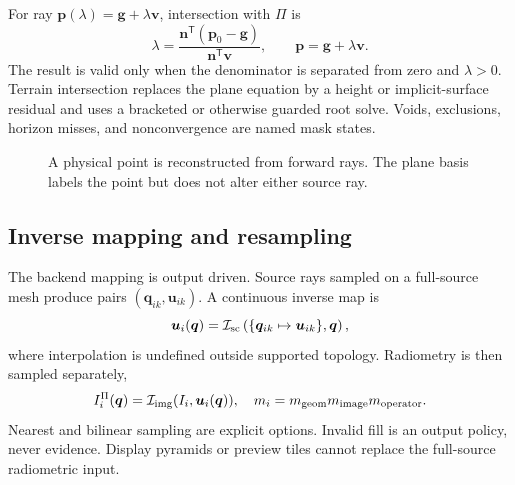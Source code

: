 \documentclass[journal]{IEEEtran}
\newcommand{\T}{^{\mathsf T}}
\begin{document}
For ray $\bm p(\lambda)=\bm g+\lambda\bm v$, intersection with $\Pi$ is
\begin{equation}
\lambda=\frac{\bm n\T(\bm p_0-\bm g)}{\bm n\T\bm v},\qquad
\bm p=\bm g+\lambda\bm v.
\label{eq:rayplane}
\end{equation}
The result is valid only when the denominator is separated from zero and
$\lambda>0$. Terrain intersection replaces the plane equation by a height or
implicit-surface residual and uses a bracketed or otherwise guarded root solve.
Voids, exclusions, horizon misses, and nonconvergence are named mask states.

\begin{figure}[t]
\centering
{}
\caption{A physical point is reconstructed from forward rays. The plane basis
labels the point but does not alter either source ray.}
\label{fig:rayplane}
\end{figure}

\subsection{Inverse mapping and resampling}

The backend mapping is output driven. Source rays sampled on a full-source mesh
produce pairs $(\bm q_{ik},\bm u_{ik})$. A continuous inverse map is
\begin{equation}
\bm u_i(\bm q)=\mathcal I_{\rm sc}
\left(\{\bm q_{ik}\mapsto\bm u_{ik}\},\bm q\right),
\label{eq:inversemap}
\end{equation}
where interpolation is undefined outside supported topology. Radiometry is then
sampled separately,
\begin{equation}
I_i^\Pi(\bm q)=\mathcal I_{\rm img}(I_i,\bm u_i(\bm q)),
\quad m_i=m_{\rm geom}m_{\rm image}m_{\rm operator}.
\label{eq:resampling}
\end{equation}
Nearest and bilinear sampling are explicit options. Invalid fill is an output
policy, never evidence. Display pyramids or preview tiles cannot replace the
full-source radiometric input.
\end{document}

